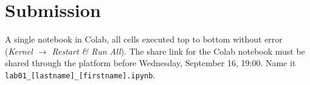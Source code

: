 \documentclass[11pt]{article}
\begin{document}
\section*{Submission}
A single notebook in Colab, all cells executed top to bottom without error (\emph{Kernel $\to$ Restart \& Run All}). 
The share link for the Colab notebook must be shared through the platform before Wednesday, September 16, 19:00. Name it \texttt{lab01\_[lastname]\_[firstname].ipynb}.
\end{document}
